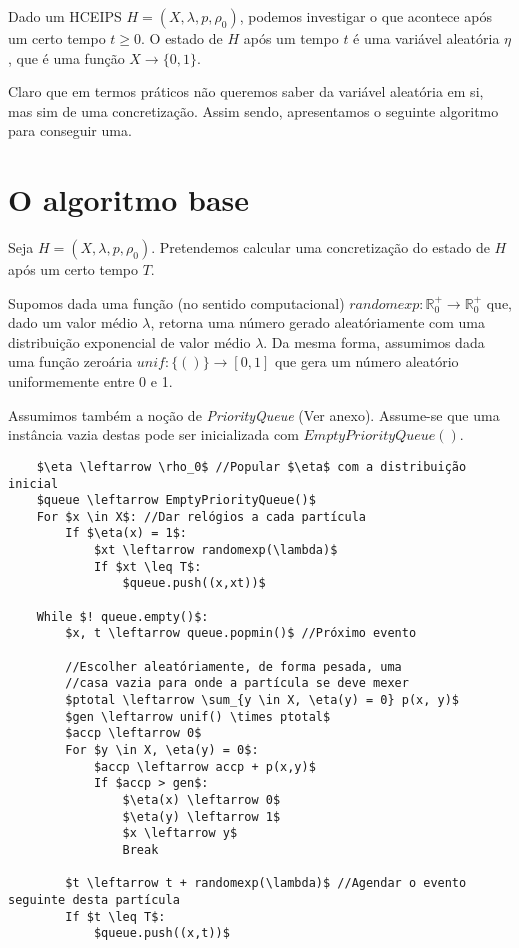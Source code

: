 \documentclass{article}
\newcommand{\R}{\mathbb{R}}
\begin{document}
	Dado um HCEIPS $H = (X, \lambda, p, \rho_0)$, podemos investigar o que acontece após um certo tempo $t \geq 0$. O estado de $H$ após um tempo $t$ é uma variável aleatória $\eta$, que é uma função $X \rightarrow \{0,1\}$.
	
	Claro que em termos práticos não queremos saber da variável aleatória em si, mas sim de uma concretização. Assim sendo, apresentamos o seguinte algoritmo para conseguir uma.
	
	\section{O algoritmo base}
	
	Seja $H = (X, \lambda, p, \rho_0)$. Pretendemos calcular uma concretização do estado de $H$ após um certo tempo $T$.
	
	Supomos dada uma função (no sentido computacional) ${randomexp : \R^+_0 \rightarrow \R^+_0}$ que, dado um valor médio $\lambda$, retorna uma número gerado aleatóriamente com uma distribuição exponencial de valor médio $\lambda$. Da mesma forma, assumimos dada uma função zeroária $unif : \{()\} \rightarrow [0,1]$ que gera um número aleatório uniformemente entre 0 e 1.
	
	Assumimos também a noção de \emph{PriorityQueue} (Ver anexo). Assume-se que uma instância vazia destas pode ser inicializada com $EmptyPriorityQueue()$.
	
	\begin{minipage}{\linewidth}
	\begin{lstlisting}
	$\eta \leftarrow \rho_0$ //Popular $\eta$ com a distribuição inicial
	$queue \leftarrow EmptyPriorityQueue()$
	For $x \in X$: //Dar relógios a cada partícula
		If $\eta(x) = 1$:
			$xt \leftarrow randomexp(\lambda)$
			If $xt \leq T$:
				$queue.push((x,xt))$

	While $! queue.empty()$:
		$x, t \leftarrow queue.popmin()$ //Próximo evento
		
		//Escolher aleatóriamente, de forma pesada, uma
		//casa vazia para onde a partícula se deve mexer
		$ptotal \leftarrow \sum_{y \in X, \eta(y) = 0} p(x, y)$
		$gen \leftarrow unif() \times ptotal$
		$accp \leftarrow 0$
		For $y \in X, \eta(y) = 0$:
			$accp \leftarrow accp + p(x,y)$
			If $accp > gen$:
				$\eta(x) \leftarrow 0$
				$\eta(y) \leftarrow 1$
				$x \leftarrow y$
				Break
		
		$t \leftarrow t + randomexp(\lambda)$ //Agendar o evento seguinte desta partícula
		If $t \leq T$:
			$queue.push((x,t))$
	\end{lstlisting}
	\end{minipage}
	
\end{document}
